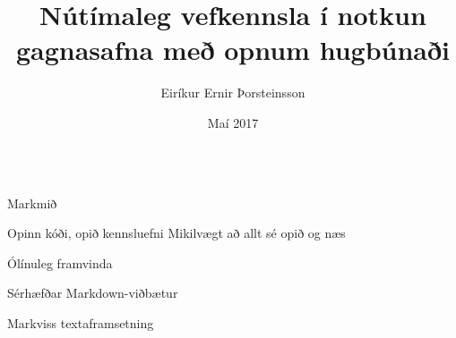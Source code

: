 \documentclass[final]{beamer}
\title{Nútímaleg vefkennsla í notkun gagnasafna með opnum hugbúnaði}
\author{Eiríkur Ernir Þorsteinsson}
\institute{Iðnaðarverkfræði-, vélaverkfræði- og tölvunarfræðideild}
\date{Maí 2017}
\begin{document}
\begin{frame}
\begin{tcolorbox}[standard jigsaw, height=97cm, colframe=orange, opacityback=0, sharp corners=all]
\begin{columns}[t]

\begin{column}{.47\linewidth}

\begin{block}{Markmið}
    
\end{block}

\begin{block}{Opinn kóði, opið kennsluefni}
    Mikilvægt að allt sé opið og næs
\end{block}

\begin{block}{Ólínuleg framvinda}
    
\end{block}

\begin{block}{Sérhæfðar Markdown-viðbætur}
\end{block}

\begin{block}{Markviss textaframsetning}
    
\end{block}
\end{column}

\begin{column}{.47\linewidth}


\end{column}
\end{columns}
\end{tcolorbox}
\end{frame}
\end{document}
